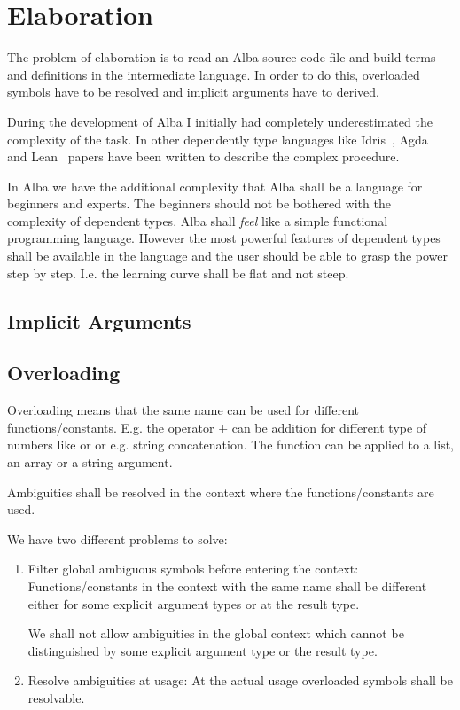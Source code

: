 \chapter{Elaboration}

The problem of elaboration is to read an Alba source code file and build terms
and definitions in the intermediate language. In order to do this, overloaded
symbols have to be resolved and implicit arguments have to derived.

During the development of Alba I initially had completely underestimated the
complexity of the task. In other dependently type languages like
Idris~\cite{brady2013}, Agda~\cite{norell2007} and Lean~\cite{demoura2015} papers
have been written to describe the complex procedure.

In Alba we have the additional complexity that Alba shall be a language for
beginners and experts. The beginners should not be bothered with the complexity
of dependent types. Alba shall \emph{feel} like a simple functional programming
language. However the most powerful features of dependent types shall be
available in the language and the user should be able to grasp the power step by
step. I.e. the learning curve shall be flat and not steep.



\section{Implicit Arguments}





\section{Overloading}

Overloading means that the same name can be used for different
functions/constants. E.g. the operator $+$ can be addition for different type of
numbers like  or  or e.g. string concatenation. The
function  can be applied to a list, an array or a string argument.

Ambiguities shall be resolved in the context where the functions/constants are
used.

We have two different problems to solve:
\begin{enumerate}

\item Filter global ambiguous symbols before entering the context:
Functions/constants in the context with the same name shall be different either
for some explicit argument types or at the result type.

We shall not allow ambiguities in the global context which cannot be
distinguished by some explicit argument type or the result type.


\item Resolve ambiguities at usage: At the actual usage overloaded symbols shall
be resolvable.

\end{enumerate}

